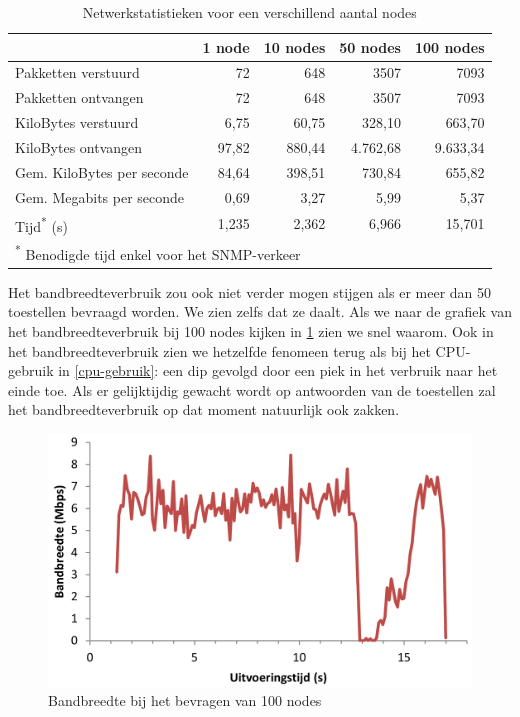 \begin{table}[h]
\centering
\begin{tabular}{@{}lrrrr@{}}
\toprule
                           & 1 node & 10 nodes & 50 nodes & 100 nodes \\ \midrule
Pakketten verstuurd        & 72     & 648      & 3507     & 7093      \\
Pakketten ontvangen        & 72     & 648      & 3507     & 7093      \\
KiloBytes verstuurd        & 6,75   & 60,75    & 328,10   & 663,70    \\
KiloBytes ontvangen        & 97,82  & 880,44   & 4.762,68  & 9.633,34   \\
Gem. KiloBytes per seconde & 84,64  & 398,51   & 730,84   & 655,82    \\
Gem. Megabits per seconde  & 0,69   & 3,27     & 5,99     & 5,37      \\
Tijd\textsuperscript{*} (s)& 1,235  & 2,362    & 6,966    & 15,701    \\ \midrule[.5pt]
\multicolumn{4}{l}{\textsuperscript{*} \footnotesize{Benodigde tijd enkel voor het SNMP-verkeer}}
\end{tabular}
\caption{Netwerkstatistieken voor een verschillend aantal nodes}
\label{tabel-bandbreedte-aantalnodes}
\end{table}

\begin{minipage}{\textwidth}
Het bandbreedteverbruik zou ook niet verder mogen stijgen als er meer dan 50 toestellen bevraagd worden.
We zien zelfs dat ze daalt.
Als we naar de grafiek van het bandbreedteverbruik bij 100 nodes kijken in \cref{fig-bandbreedte-100-nodes}
zien we snel waarom.
Ook in het bandbreedteverbruik zien we hetzelfde fenomeen terug als bij het CPU-gebruik in \cref{cpu-gebruik}:
een dip gevolgd door een piek in het verbruik naar het einde toe.
Als er gelijktijdig gewacht wordt op antwoorden van de toestellen zal het bandbreedteverbruik op dat moment natuurlijk ook zakken.
\end{minipage}

\begin{figure}[h]
	\centering
	\includegraphics[scale=0.40]{figures/bandbreedte/bandbreedte-100nodes}
	\caption{Bandbreedte bij het bevragen van 100 nodes}
	\label{fig-bandbreedte-100-nodes}
\end{figure}

